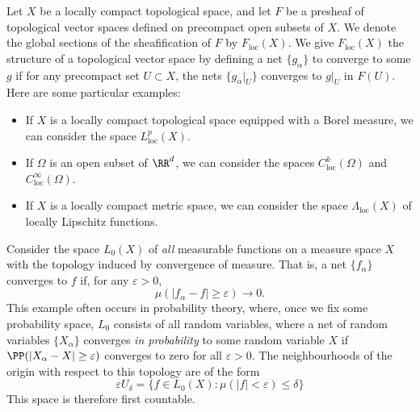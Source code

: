 \begin{example}
    Let $X$ be a locally compact topological space, and let $F$ be a presheaf of topological vector spaces defined on precompact open subsets of $X$. We denote the global sections of the sheafification of $F$ by $F_{\text{loc}}(X)$. We give $F_{\text{loc}}(X)$ the structure of a topological vector space by defining a net $\{ g_\alpha \}$ to converge to some $g$ if for any precompact set $U \subset X$, the nets $\{ g_\alpha|_U \}$ converges to $g|_U$ in $F(U)$. Here are some particular examples:
    \begin{itemize}
        \item If $X$ is a locally compact topological space equipped with a Borel measure, we can consider the space $L^p_{\text{loc}}(X)$.
        \item If $\Omega$ is an open subset of $\RR^d$, we can consider the spaces $C^k_{\text{loc}}(\Omega)$ and $C^\infty_{\text{loc}}(\Omega)$.
        \item If $X$ is a locally compact metric space, we can consider the space $\Lambda_{\text{loc}}(X)$ of locally Lipschitz functions.
    \end{itemize}
\end{example}

\begin{example}
    Consider the space $L_0(X)$ of {\it all} measurable functions on a measure space $X$ with the topology induced by convergence of measure. That is, a net $\{ f_\alpha \}$ converges to $f$ if, for any $\varepsilon > 0$,
    \[ \mu ( |f_\alpha - f| \geq \varepsilon ) \to 0. \]
    This example often occurs in probability theory, where, once we fix some probability space, $L_0$ consists of all random variables, where a net of random variables $\{ X_\alpha \}$ converges \emph{in probability} to some random variable $X$ if $\PP(|X_\alpha - X| \geq \varepsilon)$ converges to zero for all $\varepsilon > 0$. The neighbourhoods of the origin with respect to this topology are of the form
    \[ \varepsilon U_\delta = \{ f \in L_0(X): \mu(|f| < \varepsilon) \leq \delta \} \]
    This space is therefore first countable.
\end{example}

